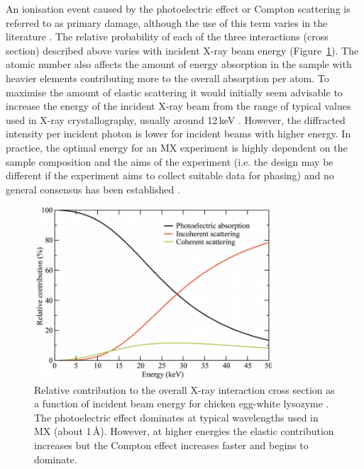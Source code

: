         An ionisation event caused by the photoelectric effect or Compton scattering is referred to as primary damage, although the use of this term varies in the literature \cite{garman2010}.
        The relative probability of each of the three interactions (cross section) described above varies with incident X-ray beam energy (Figure~\ref{fig:Relative Absorption Probabilities}).
        The atomic number also affects the amount of energy absorption in the sample with heavier elements contributing more to the overall absorption per atom.
        To maximise the amount of elastic scattering it would initially seem advisable to increase the energy of the incident X-ray beam from the range of typical values used in X-ray crystallography, usually around 12$\,$keV \cite{pait2010}.
        However, the diffracted intensity per incident photon is lower for incident beams with higher energy.
        In practice, the optimal energy for an MX experiment is highly dependent on the sample composition and the aims of the experiment (i.e. the design may be different if the experiment aims to collect suitable data for phasing) and no general consensus has been established \cite{pait2010}.
        \begin{figure}
            \centering
            \includegraphics[width=0.8\textwidth]{figures/introduction/relativeinteractions.png}
            \caption{Relative contribution to the overall X-ray interaction cross section as a function of incident beam energy for chicken egg-white lysozyme \cite{pait2010}.
            The photoelectric effect dominates at typical wavelengths used in MX (about 1\,\AA).
            However, at higher energies the elastic contribution increases but the Compton effect increases faster and begins to dominate.}
            \label{fig:Relative Absorption Probabilities}
        \end{figure}


